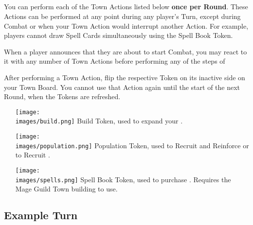 \begin{multicols*}{2}
\subsection*{}
You can perform each of the Town Actions listed below \textbf{once per Round}.
These Actions can be performed at any point during any player's Turn, except during Combat or when your Town Action would interrupt another Action.
For example, players cannot draw Spell Cards simultaneously using the Spell Book Token.\par
When a player announces that they are about to start Combat, you may react to it with any number of Town Actions before performing any of the steps of \par
After performing a Town Action, flip the respective Token on its inactive side on your Town Board.
You cannot use that Action again until the start of the next Round, when the Tokens are refreshed.
\begin{itemize}
  \item [{\texttt{[image: \\images/build.png]}}] Build Token, used to expand your .
  \item [{\texttt{[image: \\images/population.png]}}] Population Token, used to Recruit and Reinforce  or to Recruit .
  \item [{\texttt{[image: \\images/spells.png]}}]Spell Book Token, used to purchase . Requires the Mage Guild Town building to use.
\end{itemize}

\vspace*{\fill}
\vspace*{\fill}

\subsection*{Example Turn}


\end{multicols*}
